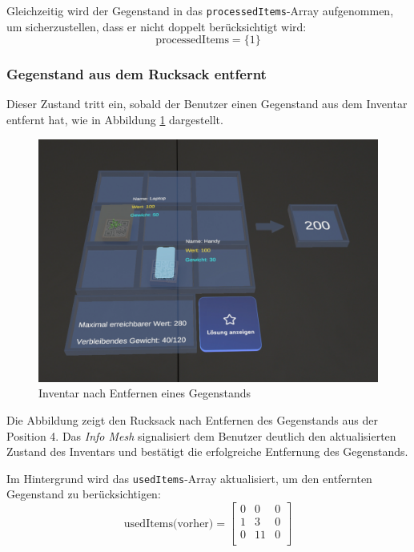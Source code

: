 Gleichzeitig wird der Gegenstand in das \texttt{processedItems}-Array aufgenommen, um sicherzustellen, dass er nicht
doppelt berücksichtigt wird:
\[
\text{processedItems} = \{1\}
\]

\subsubsection*{Gegenstand aus dem Rucksack entfernt}
Dieser Zustand tritt ein, sobald der Benutzer einen Gegenstand aus dem Inventar entfernt hat, wie in Abbildung
\ref{fig:controller_itemRemoved} dargestellt.

\begin{figure}[H]
    \centering
    \includegraphics[width=\textwidth]{images/itemEntfernt}
    \caption{Inventar nach Entfernen eines Gegenstands}
    \label{fig:controller_itemRemoved}
\end{figure}

Die Abbildung zeigt den Rucksack nach Entfernen des Gegenstands aus der Position 4. Das \textit{Info Mesh} signalisiert
dem Benutzer deutlich den aktualisierten Zustand des Inventars und bestätigt die erfolgreiche Entfernung des Gegenstands.

Im Hintergrund wird das \texttt{usedItems}-Array aktualisiert, um den entfernten Gegenstand zu berücksichtigen:
\[
\text{usedItems(vorher)} =
\left[
\begin{array}{ccccc}
0 & 0 & 0 \\
1 & 3 & 0 \\
0 & 11 & 0 \\
\end{array}
\right]
\]

